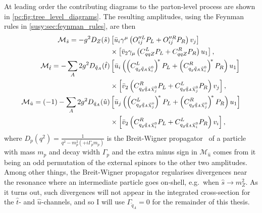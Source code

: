 \documentclass[../main.tex]{subfiles}
\begin{document}
At leading order the contributing diagrams to the parton-level process are shown in \cref{pc:fig:tree_level_diagrams}.
The resulting amplitudes, using the Feynman rules in \cref{susy:sec:feynman_rules}, are then
\begin{subequations}
  \begin{align}
    \nonumber
    \M_{\hat{s}} = -g^2 D_Z(\hat{s})                         & \bclosed{ \bar{u}_i\gamma^\mu\pclosed{O^{\prime\prime L}_{ij}P_L + O^{\prime\prime R}_{ij}P_R} v_j }                                              \\
    \label{pc:eq:Ms}
                                                             & \times \bclosed{ \bar{v}_2 \gamma_\mu \pclosed{C^L_{qqZ}P_L + C^R_{qqZ}P_R} u_1 },                                                                \\
    \nonumber
    \M_{\hat{t}} = -\sum_A 2g^2 D_{\tilde{q}_A}(\hat{t})     & \bclosed{ \bar{u}_i \pclosed{\pclosed{C_{q_g \tilde{q}_A \nino[i]}^L}^{\!\ast} P_L + \pclosed{C_{q_g \tilde{q}_A \nino[i]}^R}^{\!\ast} P_R} u_1 } \\
    \label{pc:eq:Mt}
                                                             & \times \bclosed{ \bar{v}_2 \pclosed{C_{q_g \tilde{q}_A \nino[j]}^R P_L + C_{q_g \tilde{q}_A \nino[j]}^L P_R} v_j },                               \\
    \nonumber
    \M_{\hat{u}} = (-1)-\sum_A 2g^2 D_{\tilde{q}_A}(\hat{u}) & \bclosed{ \bar{u}_j \pclosed{\pclosed{C_{q_g \tilde{q}_A \nino[j]}^L}^{\!\ast} P_L + \pclosed{C_{q_g \tilde{q}_A \nino[j]}^R}^{\!\ast} P_R} u_1 } \\
    \label{pc:eq:Mu}
                                                             & \times \bclosed{ \bar{v}_2 \pclosed{C_{q_g \tilde{q}_A \nino[i]}^R P_L + C_{q_g \tilde{q}_A \nino[i]}^L P_R} v_i },
  \end{align}
\end{subequations}
where \(D_p(q^2) = \frac{1}{q^2 - m_p^2 (+ i\Gamma_p m_p)}\) is the
Breit-Wigner propagator~\cite{Schwartz:2014sze} of a particle with mass \(m_p\) and decay
width \(\Gamma_p\) and the extra minus sign in \(\mathcal{M}_{\hat{u}}\) comes from it being an odd permutation of the external spinors to the other two amplitudes.
Among other things, the Breit-Wigner propagator regularises divergences near the resonance where an intermediate particle goes on-shell, e.g.\ when \(\hat{s} \to m_Z^2\).
As it turns out, such divergences will not appear in the integrated cross-section for the \(\hat{t}\)- and \(\hat{u}\)-channels, and so I will use \(\Gamma_{\tilde{q}_A} = 0\) for the remainder of this thesis.
\\
\end{document}
